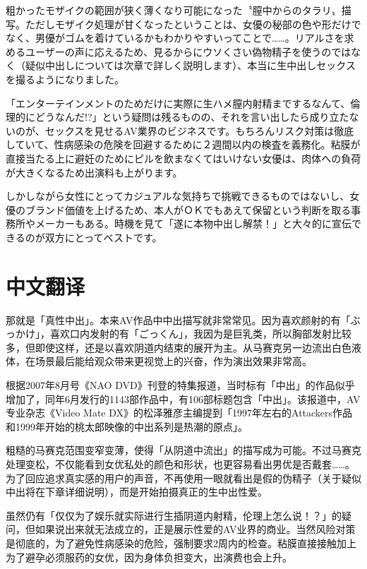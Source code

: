 \documentclass[12pt,UTF8]{ctexbook}
\begin{document}
粗かったモザイクの範囲が狭く薄くなり可能になった〝膣中からのタラリ〟描写。ただしモザイク処理が甘くなったということは、女優の秘部の色や形だけでなく、男優がゴムを着けているかもわかりやすいってことで……。リアルさを求めるユーザーの声に応えるため、見るからにウソくさい偽物精子を使うのではなく（疑似中出しについては次章で詳しく説明します）、本当に生中出しセックスを撮るようになりました。

「エンターテインメントのためだけに実際に生ハメ膣内射精までするなんて、倫理的にどうなんだ!?」という疑問は残るものの、それを言い出したら成り立たないのが、セックスを見せるAV業界のビジネスです。もちろんリスク対策は徹底していて、性病感染の危険を回避するために２週間以内の検査を義務化。粘膜が直接当たる上に避妊のためにピルを飲まなくてはいけない女優は、肉体への負荷が大きくなるため出演料も上がります。

しかしながら女性にとってカジュアルな気持ちで挑戦できるものではないし、女優のブランド価値を上げるため、本人がＯＫでもあえて保留という判断を取る事務所やメーカーもある。時機を見て「遂に本物中出し解禁！」と大々的に宣伝できるのが双方にとってベストです。

\switchcolumn

\section*{中文翻译}

那就是「真性中出」。本来AV作品中中出描写就非常常见。因为喜欢颜射的有「ぶっかけ」，喜欢口内发射的有「ごっくん」，我因为是巨乳类，所以胸部发射比较多，但即使这样，还是以喜欢阴道内结束的展开为主。从马赛克另一边流出白色液体，在场景最后能给观众带来更视觉上的兴奋，作为演出效果非常高。

根据2007年8月号《NAO DVD》刊登的特集报道，当时标有「中出」的作品似乎增加了，同年6月发行的1143部作品中，有106部标题包含「中出」。该报道中，AV专业杂志《Video Mate DX》的松泽雅彦主编提到「1997年左右的Attackers作品和1999年开始的桃太郎映像的中出系列是热潮的原点」。

粗糙的马赛克范围变窄变薄，使得「从阴道中流出」的描写成为可能。不过马赛克处理变松，不仅能看到女优私处的颜色和形状，也更容易看出男优是否戴套……。为了回应追求真实感的用户的声音，不再使用一眼就看出是假的伪精子（关于疑似中出将在下章详细说明），而是开始拍摄真正的生中出性爱。

虽然仍有「仅仅为了娱乐就实际进行生插阴道内射精，伦理上怎么说！？」的疑问，但如果说出来就无法成立的，正是展示性爱的AV业界的商业。当然风险对策是彻底的，为了避免性病感染的危险，强制要求2周内的检查。粘膜直接接触加上为了避孕必须服药的女优，因为身体负担变大，出演费也会上升。
\end{document}
